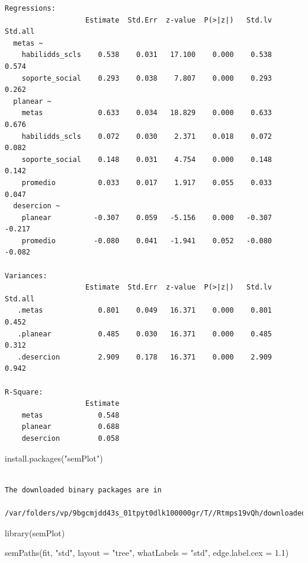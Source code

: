 \documentclass[
  letterpaper,
  DIV=11,
  numbers=noendperiod]{scrartcl}
\newenvironment{Shaded}{\begin{snugshade}}{\end{snugshade}}
\newcommand{\AttributeTok}[1]{\textcolor[rgb]{0.40,0.45,0.13}{#1}}
\newcommand{\FloatTok}[1]{\textcolor[rgb]{0.68,0.00,0.00}{#1}}
\newcommand{\FunctionTok}[1]{\textcolor[rgb]{0.28,0.35,0.67}{#1}}
\newcommand{\NormalTok}[1]{\textcolor[rgb]{0.00,0.23,0.31}{#1}}
\newcommand{\StringTok}[1]{\textcolor[rgb]{0.13,0.47,0.30}{#1}}
\begin{document}
\begin{verbatim}
Regressions:
                   Estimate  Std.Err  z-value  P(>|z|)   Std.lv  Std.all
  metas ~                                                               
    habilidds_scls    0.538    0.031   17.100    0.000    0.538    0.574
    soporte_social    0.293    0.038    7.807    0.000    0.293    0.262
  planear ~                                                             
    metas             0.633    0.034   18.829    0.000    0.633    0.676
    habilidds_scls    0.072    0.030    2.371    0.018    0.072    0.082
    soporte_social    0.148    0.031    4.754    0.000    0.148    0.142
    promedio          0.033    0.017    1.917    0.055    0.033    0.047
  desercion ~                                                           
    planear          -0.307    0.059   -5.156    0.000   -0.307   -0.217
    promedio         -0.080    0.041   -1.941    0.052   -0.080   -0.082

Variances:
                   Estimate  Std.Err  z-value  P(>|z|)   Std.lv  Std.all
   .metas             0.801    0.049   16.371    0.000    0.801    0.452
   .planear           0.485    0.030   16.371    0.000    0.485    0.312
   .desercion         2.909    0.178   16.371    0.000    2.909    0.942

R-Square:
                   Estimate
    metas             0.548
    planear           0.688
    desercion         0.058
\end{verbatim}

\begin{Shaded}
\begin{Highlighting}[]
\FunctionTok{install.packages}\NormalTok{(}\StringTok{"semPlot"}\NormalTok{)}
\end{Highlighting}
\end{Shaded}

\begin{verbatim}

The downloaded binary packages are in
    /var/folders/vp/9bgcmjdd43s_01tpyt0dlk100000gr/T//Rtmps19vQh/downloaded_packages
\end{verbatim}

\begin{Shaded}
\begin{Highlighting}[]
\FunctionTok{library}\NormalTok{(semPlot)}

\FunctionTok{semPaths}\NormalTok{(fit, }\StringTok{"std"}\NormalTok{, }\AttributeTok{layout =} \StringTok{"tree"}\NormalTok{, }\AttributeTok{whatLabels =} \StringTok{"std"}\NormalTok{, }\AttributeTok{edge.label.cex =} \FloatTok{1.1}\NormalTok{)}
\end{Highlighting}
\end{Shaded}
\end{document}
